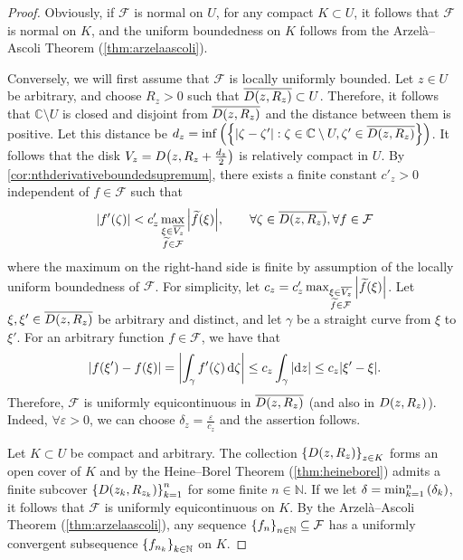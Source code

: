 \begin{proof}
    Obviously, if \(\mathcal{F}\) is normal on \(U\), for any compact \(K\subset U\), it follows that \(\mathcal{F}\) is normal on \(K\), and the uniform boundedness on \(K\) follows from the Arzelà--Ascoli Theorem (\cref{thm:arzelaascoli}).

    Conversely, we will first assume that \(\mathcal{F}\) is locally uniformly bounded. Let \(z\in U\) be arbitrary, and choose \(R_z>0\) such that \(\overline{D\qty(z,R_z)}\subset U\). Therefore, it follows that \(\mathbb{C}\setminus U\) is closed and disjoint from \(\overline{D\qty(z,R_z)}\) and the distance between them is positive. Let this distance be \(d_z=\inf\qty(\cbraces{\abs{\zeta-\zeta'}}{\zeta\in\mathbb{C}\setminus U, \zeta'\in \overline{D\qty(z,R_z)}})\). It follows that the disk \(V_z=D\qty(z,R_z+\frac{d_z}{2})\) is relatively compact in \(U\). By \cref{cor:nthderivativeboundedsupremum}, there exists a finite constant \(c'_z>0\) independent of \(f\in\mathcal{F}\) such that \[\abs{f'(\zeta)}<c'_z\max_{\substack{\xi\in\overline{V_z}\\ \widetilde{f}\in\mathcal{F}}}\abs{\widetilde{f}(\xi)},\qquad\forall \zeta\in \overline{D\qty(z,R_z)},\forall f\in\mathcal{F}\]
    where the maximum on the right-hand side is finite by assumption of the locally uniform boundedness of \(\mathcal{F}\). For simplicity, let \(c_z=c'_z\max_{\substack{\xi\in\overline{V_z}\\ \widetilde{f}\in\mathcal{F}}}\abs{\widetilde{f}(\xi)}\). Let \(\xi,\xi'\in \overline{D\qty(z,R_z)}\) be arbitrary and distinct, and let \(\gamma\) be a straight curve from \(\xi\) to \(\xi'\). For an arbitrary function \(f\in\mathcal{F}\), we have that \[\abs{f(\xi')-f(\xi)}=\abs{\int_\gamma f'(\zeta)\dd{\zeta}}\leq c_z\int_\gamma\abs{\dd{z}}\leq c_z\abs{\xi'-\xi}.\]
    Therefore, \(\mathcal{F}\) is uniformly equicontinuous in \(\overline{D\qty(z,R_z)}\) (and also in \(D\qty(z,R_z)\)). Indeed, \(\forall\varepsilon>0\), we can choose \(\delta_z=\frac{\varepsilon}{c_z}\) and the assertion follows.

    Let \(K\subset U\) be compact and arbitrary. The collection \(\cbraces{D\qty(z,R_z)}_{z\in K}\) forms an open cover of \(K\) and by the Heine--Borel Theorem (\cref{thm:heineborel}) admits a finite subcover \(\cbraces{D\qty(z_k,R_{z_k})}_{k=1}^n\) for some finite \(n\in\mathbb{N}\). If we let \(\delta=\min_{k=1}^n\qty(\delta_k)\), it follows that \(\mathcal{F}\) is uniformly equicontinuous on \(K\). By the Arzelà--Ascoli Theorem (\cref{thm:arzelaascoli}), any sequence \(\cbraces{f_n}_{n\in\mathbb{N}}\subseteq\mathcal{F}\) has a uniformly convergent subsequence \(\cbraces{f_{n_k}}_{k\in\mathbb{N}}\) on \(K\).


\end{proof}
